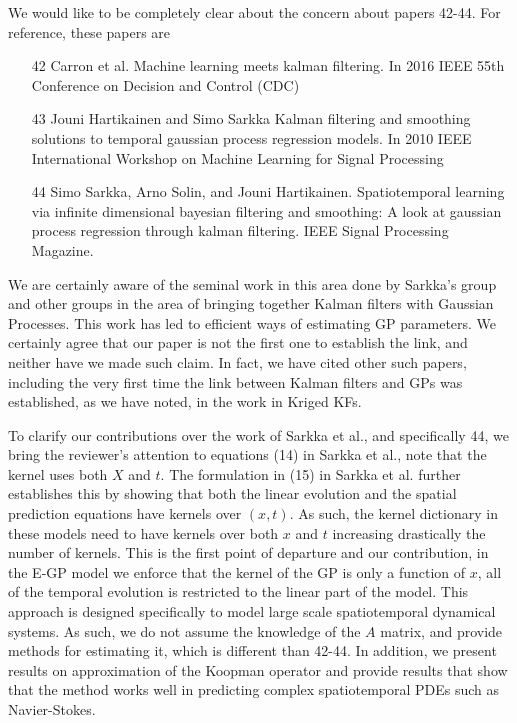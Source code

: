 \documentclass{letter}
\begin{document}
We would like to be completely clear about the concern about papers 42-44. For reference, these papers are
\begin{itemize}
	\item [42] Carron et al. Machine learning meets kalman filtering. In 2016 IEEE 55th Conference on Decision and Control (CDC)
	\item [43] Jouni Hartikainen and Simo Sarkka Kalman filtering and smoothing solutions to temporal gaussian process regression models. In 2010 IEEE International Workshop on Machine Learning for Signal Processing
	\item [44] Simo Sarkka, Arno Solin, and Jouni Hartikainen. Spatiotemporal learning via infinite dimensional bayesian filtering and smoothing: A look at gaussian process regression through kalman filtering. IEEE Signal Processing Magazine.
\end{itemize}
We are certainly aware of the seminal work in this area done by Sarkka's group and other groups in the area of bringing together Kalman filters with Gaussian Processes. This work has led to efficient ways of estimating GP parameters. We certainly agree that our paper is not the first one to establish the link, and neither have we made such claim. In fact, we have cited other such papers, including the very first time the link between Kalman filters and GPs was established, as we have noted, in the work in Kriged KFs.  

To clarify our contributions over  the work of Sarkka et al., and specifically 44, we bring the reviewer's attention to equations (14) in Sarkka et al., note that the kernel uses both $X$ and $t$. The formulation in (15) in Sarkka et al. further establishes this by showing that both the linear evolution and the spatial prediction equations have kernels over $(x,t)$. As such, the kernel dictionary in these models need to have kernels over both $x$ and $t$ increasing drastically the number of kernels. This is the first point of departure and our contribution, in the E-GP model we enforce that the kernel of the GP is only a function of $x$, all of the temporal evolution is restricted to the linear part of the model. This approach is designed specifically to model large scale spatiotemporal dynamical systems. As such, we do not assume the knowledge of the $A$ matrix, and provide methods for estimating it, which is different than 42-44. In addition, we present results on approximation of the Koopman operator and provide results that show that the method works well in predicting complex spatiotemporal PDEs such as Navier-Stokes.
\end{document}

